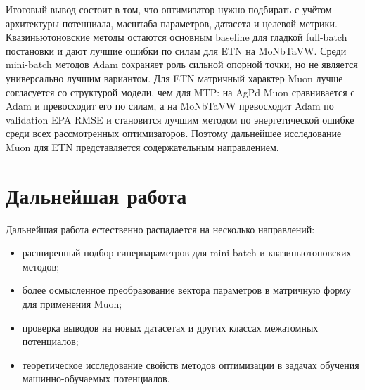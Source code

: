 \documentclass[a4paper,12pt]{extarticle}
\begin{document}
Итоговый вывод состоит в том, что оптимизатор нужно подбирать с учётом архитектуры потенциала, масштаба параметров, датасета и целевой метрики. Квазиньютоновские методы остаются основным baseline для гладкой full-batch постановки и дают лучшие ошибки по силам для ETN на MoNbTaVW. Среди mini-batch методов Adam сохраняет роль сильной опорной точки, но не является универсально лучшим вариантом. Для ETN матричный характер Muon лучше согласуется со структурой модели, чем для MTP: на AgPd Muon сравнивается с Adam и превосходит его по силам, а на MoNbTaVW превосходит Adam по validation EPA RMSE и становится лучшим методом по энергетической ошибке среди всех рассмотренных оптимизаторов. Поэтому дальнейшее исследование Muon для ETN представляется содержательным направлением.

\section{Дальнейшая работа}
\label{sec:future-work}

Дальнейшая работа естественно распадается на несколько направлений:
\begin{itemize}
    \item расширенный подбор гиперпараметров для mini-batch и квазиньютоновских методов;
    \item более осмысленное преобразование вектора параметров в матричную форму для применения Muon;
    \item проверка выводов на новых датасетах и других классах межатомных потенциалов;
    \item теоретическое исследование свойств методов оптимизации в задачах обучения машинно-обучаемых потенциалов.
\end{itemize}

\newpage


\end{document}
